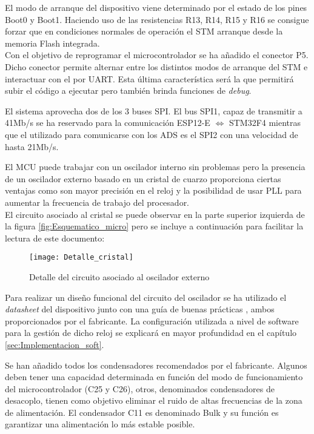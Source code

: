 El modo de arranque del dispositivo viene determinado por el estado de los pines Boot0 y Boot1. Haciendo uso de las resistencias R13, R14, R15 y R16 se consigue forzar que en condiciones normales de operación el STM arranque desde la memoria Flash integrada. 
\\Con el objetivo de reprogramar el microcontrolador se ha añadido el conector P5. Dicho conector permite alternar entre los distintos modos de arranque del STM e interactuar con el por UART. Esta última característica será la que permitirá subir el código a ejecutar pero también brinda funciones de \textit{debug}.

\clearpage

El sistema aprovecha dos de los 3 buses \acrshort{SPI}. El bus SPI1, capaz de transmitir a 41Mb/s se ha reservado para la comunicación ESP12-E $\Longleftrightarrow$ STM32F4 mientras que el utilizado para comunicarse con los ADS es el SPI2 con una velocidad de hasta 21Mb/s.

El \acrshort{MCU} puede trabajar con un oscilador interno sin problemas pero la presencia de un oscilador externo basado en un cristal de cuarzo proporciona ciertas ventajas como son mayor precisión en el reloj y la posibilidad de usar \acrshort{PLL} para aumentar la frecuencia de trabajo del procesador.
\\El circuito asociado al cristal se puede observar en la parte superior izquierda de la figura \ref{fig:Esquematico_micro} pero se incluye a continuación para facilitar la lectura de este documento:

\begin{figure} [h]
    \centering
    \texttt{[image: Detalle\_cristal]}
    \caption{Detalle del circuito asociado al oscilador externo}
    \label{fig:Detalle_cristal}
\end{figure}


Para realizar un diseño funcional del circuito del oscilador se ha utilizado el \textit{datasheet} del dispositivo junto con una guía de buenas prácticas \cite{Guia_Oscilador}, ambos proporcionados por el fabricante. La configuración utilizada a nivel de software para la gestión de dicho reloj se explicará en mayor profundidad en el capítulo \ref{sec:Implementacion_soft}.

Se han añadido todos los condensadores recomendados por el fabricante. Algunos deben tener una capacidad determinada en función del modo de funcionamiento del microcontrolador (C25 y C26), otros, denominados condensadores de desacoplo, tienen como objetivo eliminar el ruido de altas frecuencias de la zona de alimentación. El condensador C11 es denominado Bulk y su función es garantizar una alimentación lo más estable posible.

